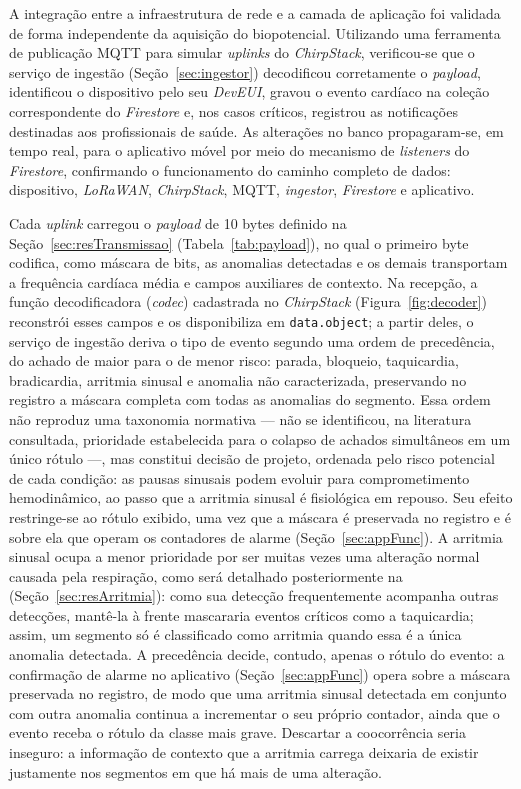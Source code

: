 A integração entre a infraestrutura de rede e a camada de aplicação foi validada de forma independente da aquisição do biopotencial. Utilizando uma ferramenta de publicação \acs{MQTT} para simular \textit{uplinks} do \textit{ChirpStack}, verificou-se que o serviço de ingestão (Seção~\ref{sec:ingestor}) decodificou corretamente o \textit{payload}, identificou o dispositivo pelo seu \textit{DevEUI}, gravou o evento cardíaco na coleção correspondente do \textit{Firestore} e, nos casos críticos, registrou as notificações destinadas aos profissionais de saúde. As alterações no banco propagaram-se, em tempo real, para o aplicativo móvel por meio do mecanismo de \textit{listeners} do \textit{Firestore}, confirmando o funcionamento do caminho completo de dados: dispositivo, \textit{LoRaWAN}, \textit{ChirpStack}, \acs{MQTT}, \textit{ingestor}, \textit{Firestore} e aplicativo.

Cada \textit{uplink} carregou o \textit{payload} de 10 bytes definido na Seção~\ref{sec:resTransmissao} (Tabela~\ref{tab:payload}), no qual o primeiro byte codifica, como máscara de bits, as anomalias detectadas e os demais transportam a frequência cardíaca média e campos auxiliares de contexto. Na recepção, a função decodificadora (\textit{codec}) cadastrada no \textit{ChirpStack} (Figura~\ref{fig:decoder}) reconstrói esses campos e os disponibiliza em \texttt{data.object}; a partir deles, o serviço de ingestão deriva o tipo de evento segundo uma ordem de precedência, do achado de maior para o de menor risco: parada, bloqueio, taquicardia, bradicardia, arritmia sinusal e anomalia não caracterizada, preservando no registro a máscara completa com todas as anomalias do segmento. Essa ordem não reproduz uma taxonomia normativa --- não se identificou, na literatura consultada, prioridade estabelecida para o colapso de achados simultâneos em um único rótulo ---, mas constitui decisão de projeto, ordenada pelo risco potencial de cada condição: as pausas sinusais podem evoluir para comprometimento hemodinâmico, ao passo que a arritmia sinusal é fisiológica em repouso. Seu efeito restringe-se ao rótulo exibido, uma vez que a máscara é preservada no registro e é sobre ela que operam os contadores de alarme (Seção~\ref{sec:appFunc}). A arritmia sinusal ocupa a menor prioridade por ser muitas vezes uma alteração normal causada pela respiração, como será detalhado posteriormente na (Seção~\ref{sec:resArritmia}): como sua detecção frequentemente acompanha outras detecções, mantê-la à frente mascararia eventos críticos como a taquicardia; assim, um segmento só é classificado como arritmia quando essa é a única anomalia detectada. A precedência decide, contudo, apenas o rótulo do evento: a confirmação de alarme no aplicativo (Seção~\ref{sec:appFunc}) opera sobre a máscara preservada no registro, de modo que uma arritmia sinusal detectada em conjunto com outra anomalia continua a incrementar o seu próprio contador, ainda que o evento receba o rótulo da classe mais grave. Descartar a coocorrência seria inseguro: a informação de contexto que a arritmia carrega deixaria de existir justamente nos segmentos em que há mais de uma alteração.


